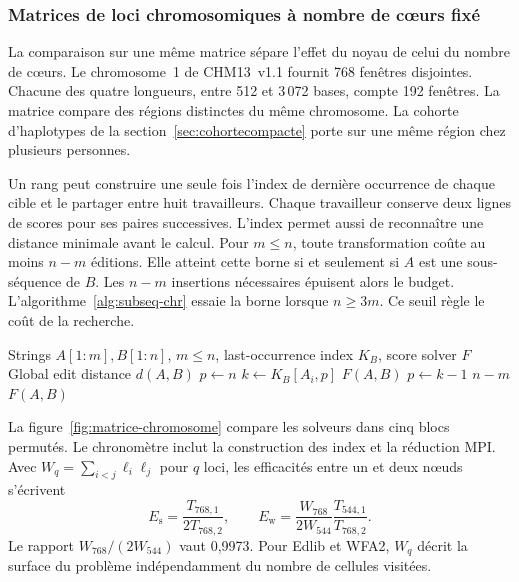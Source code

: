 \subsubsection{Matrices de loci chromosomiques à nombre de cœurs fixé}\label{sec:matrice-chromosome}
La comparaison sur une même matrice sépare l'effet du noyau de celui du nombre de cœurs. Le chromosome~1 de CHM13~v1.1 fournit 768 fenêtres disjointes. Chacune des quatre longueurs, entre 512 et 3\,072 bases, compte 192 fenêtres. La matrice compare des régions distinctes du même chromosome. La cohorte d'haplotypes de la section~\ref{sec:cohortecompacte} porte sur une même région chez plusieurs personnes.

Un rang peut construire une seule fois l'index de dernière occurrence de chaque cible et le partager entre huit travailleurs. Chaque travailleur conserve deux lignes de scores pour ses paires successives. L'index permet aussi de reconnaître une distance minimale avant le calcul. Pour \(m\le n\), toute transformation coûte au moins \(n-m\) éditions. Elle atteint cette borne si et seulement si \(A\) est une sous-séquence de \(B\). Les \(n-m\) insertions nécessaires épuisent alors le budget. L'algorithme~\ref{alg:subseq-chr} essaie la borne lorsque \(n\ge 3m\). Ce seuil règle le coût de la recherche.

\begin{algorithm}[!htbp]
\caption{Reconnaissance d’une sous-séquence par dernières occurrences}\label{alg:subseq-chr}
\begin{algorithmic}[1]
\Require Strings \(A[1:m], B[1:n]\), \(m\le n\), last-occurrence index \(K_B\), score solver \(F\)
\Ensure Global edit distance \(d(A,B)\)
  \State \(p\gets n\)
    \State \(k\gets K_B[A_i,p]\)
     \State \Return \(F(A,B)\) \EndIf
    \State \(p\gets k-1\)
  \EndFor
  \State \Return \(n-m\)
\EndIf
\State \Return \(F(A,B)\)
\end{algorithmic}
\end{algorithm}

La figure~\ref{fig:matrice-chromosome} compare les solveurs dans cinq blocs permutés. Le chronomètre inclut la construction des index et la réduction MPI. Avec \(W_q=\sum_{i<j}\ell_i\ell_j\) pour \(q\) loci, les efficacités entre un et deux nœuds s'écrivent
\[
  E_{\mathrm s}=\frac{T_{768,1}}{2T_{768,2}},\qquad
  E_{\mathrm w}=\frac{W_{768}}{2W_{544}}\frac{T_{544,1}}{T_{768,2}}.
\]
Le rapport \(W_{768}/(2W_{544})\) vaut 0,9973. Pour Edlib et WFA2, \(W_q\) décrit la surface du problème indépendamment du nombre de cellules visitées.

